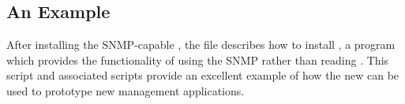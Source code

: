 \subsection*	{An Example}
After installing the SNMP-capable ,
the  file describes how to install ,
a program which provides the functionality of  using the SNMP
rather than reading .
This script and associated  scripts provide an excellent example of
how the new  can be used to prototype new management applications.


